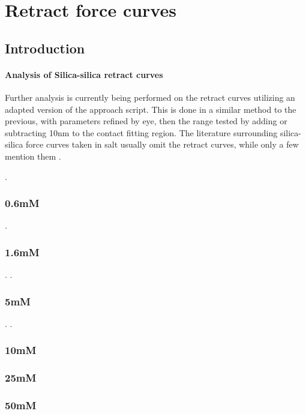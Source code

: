 \chapter{Retract force curves}

\section{Introduction}

\subsubsection{Analysis of Silica-silica retract curves}

Further analysis is currently being performed on the retract curves utilizing an adapted version of the approach script. This is done in a similar method to the previous, with parameters refined by eye, then the range tested by adding or subtracting 10nm to the contact fitting region. The literature surrounding silica-silica force curves taken in salt usually omit the retract curves, while only a few mention them \cite{Retrace}. 

\cite{John}.

\newpage

\subsection{0.6mM}
\newpage.
\newpage

\subsection{1.6mM}
.
\newpage.
\newpage

\subsection{5mM}
.
\newpage.
\newpage

\subsection{10mM}

\newpage

\subsection{25mM}

\newpage

\subsection{50mM}

